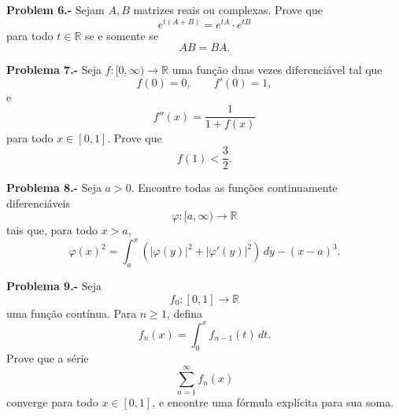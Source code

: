 \documentclass[10pt,a4paper]{amsart}
\begin{document}
\vspace{5mm}

\textbf{Problem 6.-} Sejam \(A,B\) matrizes reais ou complexas. Prove que
\[
e^{t(A+B)}=e^{tA}\cdot e^{tB}
\]
para todo \(t\in\mathbb{R}\) se e somente se
\[
AB=BA.
\]

\vspace{5mm}

\textbf{Problema 7.-}
Seja \(f:[0,\infty)\to\mathbb{R}\) uma função duas vezes diferenciável tal que
\[
f(0)=0,\qquad f'(0)=1,
\]
e
\[
f''(x)=\frac{1}{1+f(x)}
\]
para todo \(x\in[0,1]\). Prove que
\[
f(1)<\frac{3}{2}.
\]

\vspace{5mm}

\textbf{Problema 8.-}
Seja \(a>0\). Encontre todas as funções continuamente diferenciáveis
\[
\varphi:[a,\infty)\to\mathbb{R}
\]
tais que, para todo \(x>a\),
\[
\varphi(x)^2
=
\int_a^x \left(|\varphi(y)|^2+|\varphi'(y)|^2\right)\,dy
-(x-a)^3.
\]

\vspace{5mm}

\textbf{Problema 9.-}
Seja
\[
f_0:[0,1]\to\mathbb{R}
\]
uma função contínua. Para \(n\geq 1\), defina
\[
f_n(x)=\int_0^x f_{n-1}(t)\,dt.
\]
Prove que a série
\[
\sum_{n=1}^{\infty} f_n(x)
\]
converge para todo \(x\in[0,1]\), e encontre uma fórmula explícita para sua soma.

\vspace{5mm}
\end{document}
